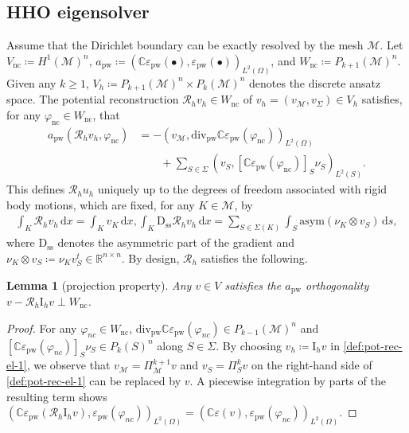 \documentclass[a4paper]{amsart}
\numberwithin{equation}{section}
\renewcommand{\d}[1]{\,\mathrm{d}#1}
\renewcommand{\div}{\mathrm{div}}
\newcommand{\I}{\mathrm{I}}
\newcommand{\D}{\mathrm{D}}
\newcommand{\Mcal}{\mathcal{M}}
\newcommand{\pw}{\mathrm{pw}}
\newtheorem{lemma}[theorem]{Lemma}
\theoremstyle{remark}
\theoremstyle{definition}
\theoremstyle{assumptionnoperiod}
\begin{document}
\subsection{HHO eigensolver}\label{sec:le-eigensolver}
Assume that the Dirichlet boundary can be exactly resolved by the mesh $\Mcal$.
Let $V_\mathrm{nc} \coloneqq H^1(\Mcal)^n$, $a_\pw \coloneqq (\mathbb{C} \varepsilon_\pw(\bullet), \varepsilon_\pw(\bullet))_{L^2(\Omega)}$, and $W_\mathrm{nc} \coloneqq P_{k+1}(\Mcal)^n$.
Given any $k \geq 1$, $V_h \coloneqq P_{k+1}(\Mcal)^n \times P_k(\Mcal)^n$ denotes the discrete ansatz space. The potential reconstruction $\mathcal{R}_h v_h \in W_\mathrm{nc}$ of $v_h = (v_\Mcal, v_\Sigma) \in V_h$ satisfies, for any $\varphi_\mathrm{nc} \in W_\mathrm{nc}$, that
\begin{align}\label{def:pot-rec-el-1}
	a_\pw(\mathcal{R}_h v_h, \varphi_\mathrm{nc}) &= -(v_\Mcal, \div_\pw \mathbb{C} \varepsilon_\pw(\varphi_\mathrm{nc}))_{L^2(\Omega)}\nonumber\\
	&\qquad+ \sum_{S \in \Sigma} (v_S, [\mathbb{C} \varepsilon_\pw (\varphi_\mathrm{nc})]_S \nu_S)_{L^2(S)}.
\end{align}
This defines $\mathcal{R}_h u_h$ uniquely up to the degrees of freedom associated with rigid body motions, which are fixed, for any $K \in \Mcal$, by
\begin{align}\label{def:pot-rec-el-2}
	\int_K \mathcal{R}_h v_h \d{x} = \int_K v_K \d{x}, \int_K \D_\mathrm{ss} \mathcal{R}_h v_h \d{x} = \sum_{S \in \Sigma(K)} \int_S \mathrm{asym}(\nu_K \otimes v_S) \d{s},
\end{align}
where $\D_\mathrm{ss}$ denotes the asymmetric part of the gradient and $\nu_K \otimes v_S \coloneqq \nu_K v_S^t \in \mathbb{R}^{n \times n}$.
By design, $\mathcal{R}_h$ satisfies the following.

\begin{lemma}[projection property]\label{lem:projection-linear-elasticity}
	Any $v \in V$ satisfies the $a_\pw$ orthogonality $v - \mathcal{R}_h \I_h v \perp W_\mathrm{nc}$.
\end{lemma}

\begin{proof}
	For any $\varphi_{nc} \in W_\mathrm{nc}$, $\div_\pw \mathbb{C} \varepsilon_\pw(\varphi_{nc}) \in P_{k-1}(\Mcal)^n$ and $[\mathbb{C} \varepsilon_\pw(\varphi_{nc})]_S \nu_S \in P_k(S)^n$ along $S \in \Sigma$.
	By choosing $v_h \coloneqq \I_h v$ in \eqref{def:pot-rec-el-1}, we observe that $v_\Mcal = \Pi_\Mcal^{k+1} v$ and $v_S = \Pi_S^k v$ on the right-hand side of \eqref{def:pot-rec-el-1} can be replaced by $v$. A piecewise integration by parts of the resulting term shows $(\mathbb{C} \varepsilon_\pw(\mathcal{R}_h \I_h v),\varepsilon_\pw(\varphi_{nc}))_{L^2(\Omega)} = (\mathbb{C} \varepsilon(v), \varepsilon_\pw(\varphi_{nc}))_{L^2(\Omega)}$.
\end{proof}
\end{document}
